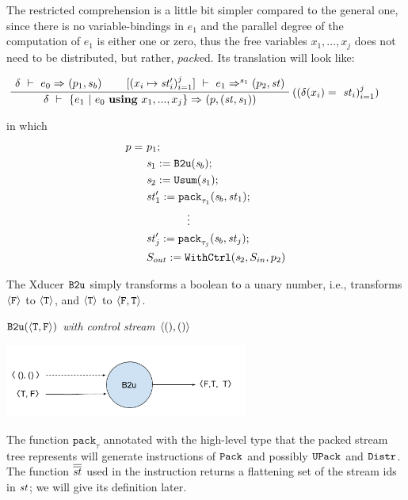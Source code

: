 The restricted comprehension is a little bit simpler compared to the general one, since there is no variable-bindings in $e_1$ and the parallel degree of the computation of $e_1$ is either one or zero, thus the free variables $x_1,...,x_j$ does not need to be distributed, but rather, $pack$ed. Its translation will look like:

$$\PT{
	\AC{\Trans{\del}{e_0}{}{}{(p_1,s_b)}}
	\AC{\Trans{[\j{x_i \|-> \st'_i}]}{e_1}{s_1}{}{\sfun{p_2}{\st}}}
	\RiLa{(\j{\del(x_i) = \ \st_i})}		
	\BC{\Trans{\del}{\RComp{e_1}{e_0}{\usevars}}{}{}
		{ \sfun{p} {(\st,\s_1)}}}
}$$


in which $$ \begin{aligned}
p = & \ p_1; \\
& \ \sdef{\s_1}{\bu(\s_b)}; \\
& \ \sdef{\s_2}{\usum(\s_1)}; \\
& \ \sdef{\st_1'}{\Pack{\s_b}{\st_1}{\tau_1}}; \\
& \qquad \qquad \vdots \\
& \ \sdef{\st_j'}{\Pack{\s_b}{\st_j}{\tau_j}}; \\
& \ \withctrl{\s_2}{p_2}{\Sin}{\Sout} \\
\end{aligned}$$
	
The Xducer $\bu$ simply transforms a boolean to a unary number, i.e.,  transforms $\oF$ to $\oT$, and $\oT$ to $\< \F, \T \'>$.
\begin{example} \emph{$\bu({\<\T,\F\'>})$ with control stream $\< (),() \'>$}\\
	\begin{center}
		\includegraphics[width=0.6\textwidth]{fig/b2uxducer.png}
	\end{center}
\end{example}

The function $\mathtt{pack}_{\tau}$ annotated with the high-level type  that the packed stream tree represents will generate instructions of $\pack$ and possibly $\upack$ and $\distr$. The function $\olol{st}$  used in the instruction \wc returns a flattening set of the stream ids in $\st$; we will give its definition later.

